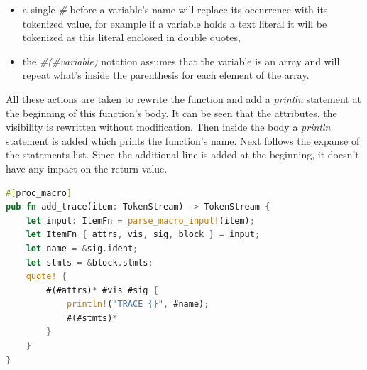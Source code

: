 \begin{itemize}
    \item a single \textit{\#} before a variable's name will replace its occurrence with its tokenized value, for example if a variable holds a text literal it will be tokenized as this literal enclosed in double quotes,
    \item the \textit{\#(\#variable)\*} notation assumes that the variable is an array and will repeat what's inside the parenthesis for each element of the array.
\end{itemize}
All these actions are taken to rewrite the function and add a \textit{println} statement at the beginning of this function's body. It can be seen that the attributes, the visibility is rewritten without modification. Then inside the body a \textit{println} statement is added which prints the function's name. Next follows the expanse of the statements list. Since the additional line is added at the beginning, it doesn't have any impact on the return value.

\begin{minipage}{.9\textwidth}
    \begin{lstlisting}[language=rust,caption={A procedural macro example.},captionpos=b,label={proc_macro}]
#[proc_macro]
pub fn add_trace(item: TokenStream) -> TokenStream {
    let input: ItemFn = parse_macro_input!(item);
    let ItemFn { attrs, vis, sig, block } = input;
    let name = &sig.ident;
    let stmts = &block.stmts;
    quote! {
        #(#attrs)* #vis #sig {
            println!("TRACE {}", #name);
            #(#stmts)*
        }
    }
}
    \end{lstlisting}
\end{minipage}

